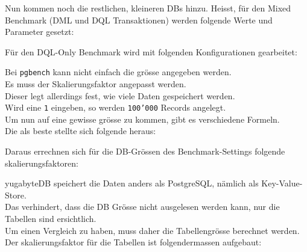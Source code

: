 \begin{flushleft}
    Nun kommen noch die restlichen, kleineren DBs hinzu.
    Heisst, für den Mixed Benchmark (DML und DQL \Gls{Transaktion}en) werden folgende Werte und Parameter gesetzt:
    
\end{flushleft}
\begin{flushleft}
    Für den DQL-Only Benchmark wird mit folgenden Konfigurationen gearbeitet:
    
\end{flushleft}
\begin{flushleft}
    Bei \texttt{pgbench} kann nicht einfach die grösse angegeben werden.\\
    Es muss der Skalierungsfaktor angepasst werden.\\
    Dieser legt allerdings fest, wie viele Daten gespeichert werden.\\
    Wird eine \texttt{1} eingeben, so werden \texttt{100'000} Records angelegt.\\

    Um nun auf eine gewisse grösse zu kommen, gibt es verschiedene Formeln.\\
    Die als beste stellte sich folgende heraus\cite{DKXU3QRC}:\\
    
\end{flushleft}
\begin{flushleft}
    Daraus errechnen sich für die DB-Grössen des Benchmark-Settings folgende skalierungsfaktoren:\\
    
\end{flushleft}
\begin{flushleft}
    yugabyteDB speichert die Daten anders als PostgreSQL, nämlich als \Gls{Key-Value-Store}.\\
    Das verhindert, dass die DB Grösse nicht ausgelesen werden kann, nur die Tabellen sind ersichtlich.\\
    Um einen Vergleich zu haben, muss daher die Tabellengrösse berechnet werden.\\
    Der skalierungsfaktor für die Tabellen ist folgendermassen aufgebaut:\\
    
\end{flushleft}